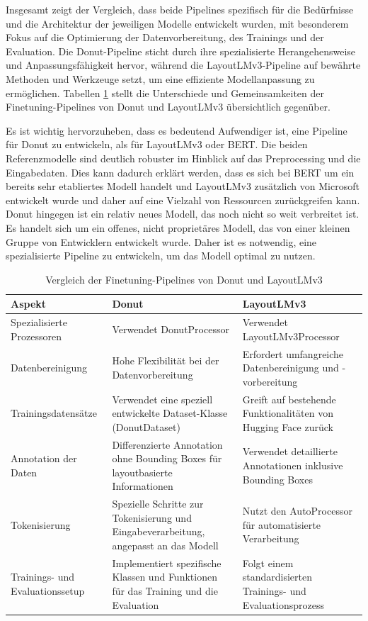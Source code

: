 Insgesamt zeigt der Vergleich, dass beide Pipelines spezifisch für die Bedürfnisse und die Architektur der jeweiligen Modelle entwickelt wurden, mit besonderem Fokus auf die Optimierung der Datenvorbereitung, des Trainings und der Evaluation. Die Donut-Pipeline sticht durch ihre spezialisierte Herangehensweise und Anpassungsfähigkeit hervor, während die LayoutLMv3-Pipeline auf bewährte Methoden und Werkzeuge setzt, um eine effiziente Modellanpassung zu ermöglichen. Tabellen \ref{tab:donut_layoutlmv3_comparison} stellt die Unterschiede und Gemeinsamkeiten der Finetuning-Pipelines von Donut und LayoutLMv3 übersichtlich gegenüber.

Es ist wichtig hervorzuheben, dass es bedeutend Aufwendiger ist, eine Pipeline für Donut zu entwickeln, als für LayoutLMv3 oder BERT. Die beiden Referenzmodelle sind deutlich robuster im Hinblick auf das Preprocessing und die Eingabedaten. Dies kann dadurch erklärt werden, dass es sich bei BERT um ein bereits sehr etabliertes Modell handelt und LayoutLMv3 zusätzlich von Microsoft entwickelt wurde und daher auf eine Vielzahl von Ressourcen zurückgreifen kann. Donut hingegen ist ein relativ neues Modell, das noch nicht so weit verbreitet ist. Es handelt sich um ein offenes, nicht proprietäres Modell, das von einer kleinen Gruppe von Entwicklern entwickelt wurde. Daher ist es notwendig, eine spezialisierte Pipeline zu entwickeln, um das Modell optimal zu nutzen.

\begin{table}[ht]
    \centering
    \begin{tabularx}{\textwidth}{@{}lXX@{}}
    \toprule
    \textbf{Aspekt} & \textbf{Donut} & \textbf{LayoutLMv3} \\
    \midrule
    Spezialisierte Prozessoren & Verwendet DonutProcessor & Verwendet LayoutLMv3Processor \\
    Datenbereinigung & Hohe Flexibilität bei der Datenvorbereitung & Erfordert umfangreiche Datenbereinigung und -vorbereitung \\
    Trainingsdatensätze & Verwendet eine speziell entwickelte Dataset-Klasse (DonutDataset) & Greift auf bestehende Funktionalitäten von Hugging Face zurück \\
    Annotation der Daten & Differenzierte Annotation ohne Bounding Boxes für layoutbasierte Informationen & Verwendet detaillierte Annotationen inklusive Bounding Boxes \\
    Tokenisierung & Spezielle Schritte zur Tokenisierung und Eingabeverarbeitung, angepasst an das Modell & Nutzt den AutoProcessor für automatisierte Verarbeitung \\
    Trainings- und Evaluationssetup & Implementiert spezifische Klassen und Funktionen für das Training und die Evaluation & Folgt einem standardisierten Trainings- und Evaluationsprozess \\
    \bottomrule
    \end{tabularx}
    \caption{Vergleich der Finetuning-Pipelines von Donut und LayoutLMv3}
    \label{tab:donut_layoutlmv3_comparison}
\end{table}
    

